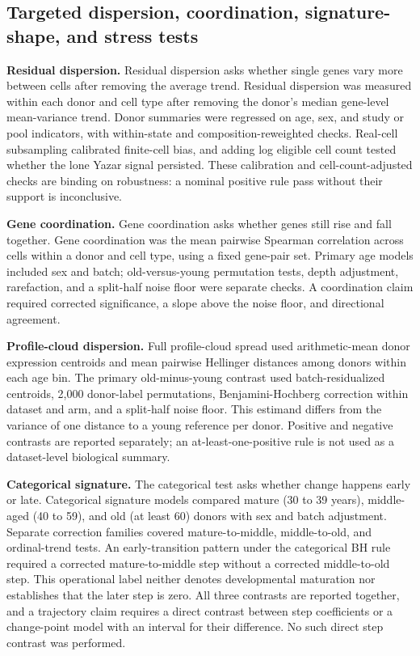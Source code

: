 \documentclass[11pt]{article}
\begin{document}
\subsection*{Targeted dispersion, coordination, signature-shape, and stress tests}

\textbf{Residual dispersion.} Residual dispersion asks whether single genes vary more between cells after removing the average trend. Residual dispersion was measured within each donor and cell type after removing the donor's median gene-level mean-variance trend. Donor summaries were regressed on age, sex, and study or pool indicators, with within-state and composition-reweighted checks. Real-cell subsampling calibrated finite-cell bias, and adding log eligible cell count tested whether the lone Yazar signal persisted. These calibration and cell-count-adjusted checks are binding on robustness: a nominal positive rule pass without their support is inconclusive.

\textbf{Gene coordination.} Gene coordination asks whether genes still rise and fall together. Gene coordination was the mean pairwise Spearman correlation across cells within a donor and cell type, using a fixed gene-pair set. Primary age models included sex and batch; old-versus-young permutation tests, depth adjustment, rarefaction, and a split-half noise floor were separate checks. A coordination claim required corrected significance, a slope above the noise floor, and directional agreement.

\textbf{Profile-cloud dispersion.} Full profile-cloud spread used arithmetic-mean donor expression centroids and mean pairwise Hellinger distances among donors within each age bin. The primary old-minus-young contrast used batch-residualized centroids, 2,000 donor-label permutations, Benjamini-Hochberg correction within dataset and arm, and a split-half noise floor. This estimand differs from the variance of one distance to a young reference per donor. Positive and negative contrasts are reported separately; an at-least-one-positive rule is not used as a dataset-level biological summary.

\textbf{Categorical signature.} The categorical test asks whether change happens early or late. Categorical signature models compared mature (30 to 39 years), middle-aged (40 to 59), and old (at least 60) donors with sex and batch adjustment. Separate correction families covered mature-to-middle, middle-to-old, and ordinal-trend tests. An early-transition pattern under the categorical BH rule required a corrected mature-to-middle step without a corrected middle-to-old step. This operational label neither denotes developmental maturation nor establishes that the later step is zero. All three contrasts are reported together, and a trajectory claim requires a direct contrast between step coefficients or a change-point model with an interval for their difference. No such direct step contrast was performed.
\end{document}
